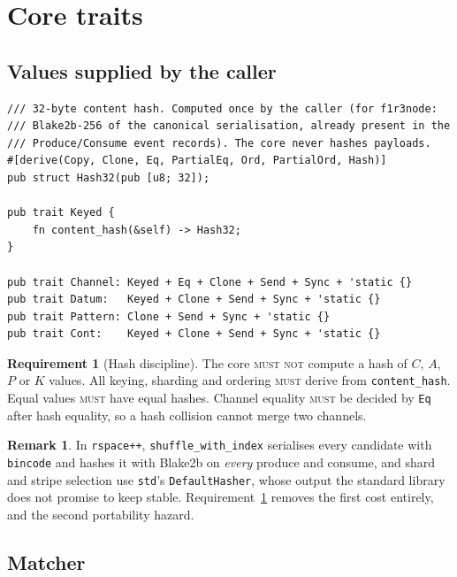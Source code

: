 \documentclass[11pt]{article}
\theoremstyle{plain}
\theoremstyle{definition}
\newtheorem{requirement}{Requirement}
\newtheorem{remark}[proposition]{Remark}
\newcommand{\MUST}{\textsc{must}}
\newcommand{\MUSTNOT}{\textsc{must not}}
\newcommand{\code}[1]{\texttt{#1}}
\begin{document}
\section{Core traits}\label{sec:traits}

\subsection{Values supplied by the caller}

\begin{lstlisting}
/// 32-byte content hash. Computed once by the caller (for f1r3node:
/// Blake2b-256 of the canonical serialisation, already present in the
/// Produce/Consume event records). The core never hashes payloads.
#[derive(Copy, Clone, Eq, PartialEq, Ord, PartialOrd, Hash)]
pub struct Hash32(pub [u8; 32]);

pub trait Keyed {
    fn content_hash(&self) -> Hash32;
}

pub trait Channel: Keyed + Eq + Clone + Send + Sync + 'static {}
pub trait Datum:   Keyed + Clone + Send + Sync + 'static {}
pub trait Pattern: Clone + Send + Sync + 'static {}
pub trait Cont:    Keyed + Clone + Send + Sync + 'static {}
\end{lstlisting}

\begin{requirement}[Hash discipline]\label{req:hash}
The core \MUSTNOT{} compute a hash of $C$, $A$, $P$ or $K$ values. All keying,
sharding and ordering \MUST{} derive from \code{content\_hash}. Equal values
\MUST{} have equal hashes. Channel equality \MUST{} be decided by \code{Eq} after
hash equality, so a hash collision cannot merge two channels.
\end{requirement}

\begin{remark}
In \code{rspace++}, \code{shuffle\_with\_index} serialises every candidate with
\code{bincode} and hashes it with Blake2b on \emph{every} produce and consume,
and shard and stripe selection use \code{std}'s \code{DefaultHasher}, whose output
the standard library does not promise to keep stable. Requirement~\ref{req:hash}
removes the first cost entirely, and the second portability hazard.
\end{remark}

\subsection{Matcher}
\end{document}
